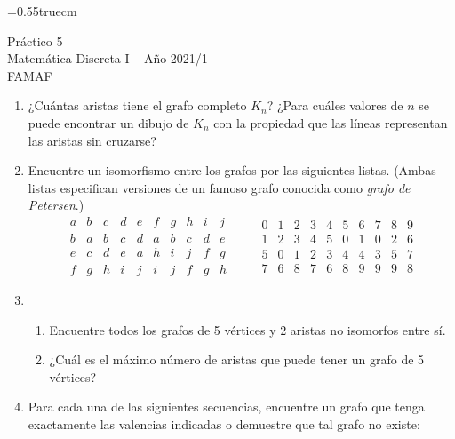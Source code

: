 \documentclass[a4paper,12pt,twoside,spanish,reqno]{amsbook}
\numberwithin{equation}{section}
\begin{document}
    \baselineskip=0.55truecm %
    

{\bf \begin{center}\large  Práctico 5 \\ Matemática Discreta I -- Año 2021/1 \\ FAMAF \end{center}}





\begin{enumerate}
\setlength\itemsep{1.1em}

\item  ¿Cuántas aristas tiene el  grafo completo $K_n$? ¿Para cuáles valores de $n$ se puede encontrar un dibujo de $K_n$ con la propiedad que las líneas representan las aristas sin cruzarse?


\item Encuentre un isomorfismo entre los grafos por las siguientes listas. (Ambas listas especifican versiones de un famoso grafo conocida como {\it grafo de Petersen}.)
$$
\begin{matrix}
a&b&c&d&e&f&g&h&i&j\\ \hline
b&a&b&c&d&a&b&c&d&e\\
e&c&d&e&a&h&i&j&f&g\\
f&g&h&i&j&i&j&f&g&h
\end{matrix}
\qquad \begin{matrix}
0&1&2&3&4&5&6&7&8&9\\ \hline
1&2&3&4&5&0&1&0&2&6\\
5&0&1&2&3&4&4&3&5&7\\
7&6&8&7&6&8&9&9&9&8
\end{matrix}
$$

\item
\begin{enumerate}
\item Encuentre todos los grafos de 5 vértices y 2 aristas no isomorfos entre sí.
 \item ¿Cuál es el máximo número de aristas que puede tener un grafo de 5 vértices?
\end{enumerate}


\item Para cada una de las siguientes secuencias, encuentre un grafo que tenga exactamente las valencias indicadas o demuestre que tal grafo no existe:
\end{enumerate}
\end{document}
